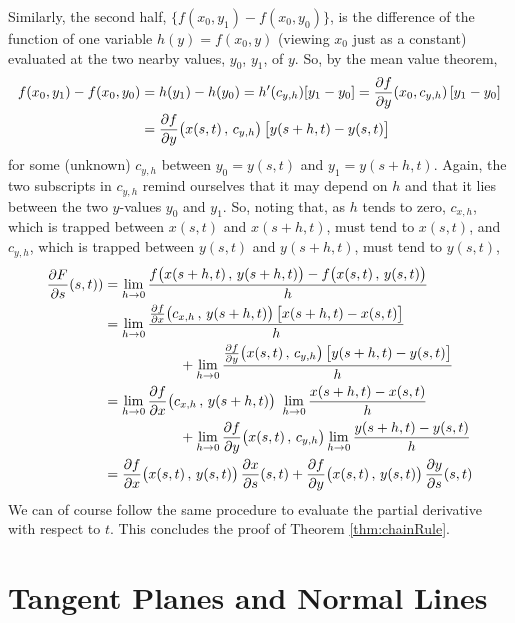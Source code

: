 Similarly, the second half, $\big\{f(x_0,y_1) - f(x_0,y_0)\big\}$, 
is the difference of the function of one variable  $h(y) = f(x_0,y)$ 
(viewing $x_0$ just as a constant)
evaluated at the two nearby values, $y_0$, $y_1$, of $y$. So, by the mean
value theorem,
\begin{align*}
f(x_0,y_1) - f(x_0,y_0)
&=h(y_1) - h(y_0)
=h'(c_{y,h}) [y_1-y_0]
=\pdiff{f}{y}(x_0,c_{y,h})\,[y_1-y_0] \\
&=\pdiff{f}{y}\big(x(s,t)\,,\,c_{y,h}\big)\,\big[y(s+h,t)-y(s,t)\big] 
\end{align*}
for some (unknown) $c_{y,h}$ between $y_0=y(s,t)$ and $y_1=y(s+h,t)$.
Again, the two subscripts in $c_{y,h}$ remind ourselves that
it may depend on $h$ and that it lies between the two $y$-values
$y_0$ and $y_1$.
So, noting that, as $h$ tends to zero, $c_{x,h}$, which is trapped
between $x(s,t)$ and $x(s+h,t)$, must tend to $x(s,t)$, and
$c_{y,h}$, which is trapped between $y(s,t)$ and $y(s+h,t)$, must tend to $y(s,t)$,
\begin{align*}
\pdiff{F}{s}(s,t))  
&= \lim_{h\rightarrow 0}\frac{f\big(x(s+h,t)\,,\,y(s+h,t)\big)
                       -f\big(x(s,t)\,,\,y(s,t)\big)}{h} \\
&= \lim_{h\rightarrow 0}\frac{
      \pdiff{f}{x}\big(c_{x,h}\,,\,y(s+h,t)\big)\,\big[x(s+h,t)-x(s,t)\big]
       }{h} \\
&\hskip0.75in+ \lim_{h\rightarrow 0}\frac{
      \pdiff{f}{y}\big(x(s,t)\,,\,c_{y,h}\big)\,\big[y(s+h,t)-y(s,t)\big] }{h} \\
&= \lim_{h\rightarrow 0}
      \pdiff{f}{x}\big(c_{x,h}\,,\,y(s+h,t)\big)\ 
    \lim_{h\rightarrow 0}\frac{x(s+h,t)-x(s,t)}{h} \\
&\hskip0.75in+ \lim_{h\rightarrow 0}
      \pdiff{f}{y}\big(x(s,t)\,,\,c_{y,h}\big)
     \lim_{h\rightarrow 0}\frac{y(s+h,t)-y(s,t) }{h} \\
&=  \pdiff{f}{x}\big(x(s,t)\,,\,y(s,t)\big)\, \pdiff{x}{s}(s,t)
   +\pdiff{f}{y}\big(x(s,t)\,,\,y(s,t)\big)\, \pdiff{y}{s}(s,t)
\end{align*}
We can of course follow the same procedure to evaluate the partial derivative 
with respect to $t$. This concludes the proof of Theorem \ref{thm:chainRule}.





\section{Tangent Planes and Normal Lines}\label{sec tangent planes}

